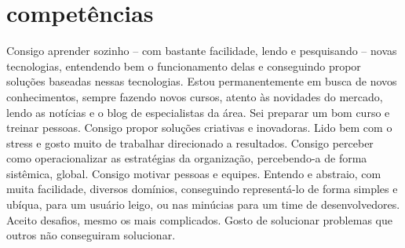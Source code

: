 \section{competências}

Consigo aprender sozinho – com bastante facilidade, lendo e pesquisando – novas tecnologias, entendendo bem o funcionamento delas e conseguindo propor soluções baseadas nessas tecnologias. Estou permanentemente em busca de novos conhecimentos, sempre fazendo novos cursos, atento às novidades do mercado, lendo as notícias e o blog de especialistas da área.
Sei preparar um bom curso e treinar pessoas.
Consigo propor soluções criativas e inovadoras.
Lido bem com o stress e gosto muito de trabalhar direcionado a resultados.
Consigo perceber como operacionalizar as estratégias da organização, percebendo-a de forma sistêmica, global.
Consigo motivar pessoas e equipes.
Entendo e abstraio, com muita facilidade, diversos domínios, conseguindo representá-lo de forma simples e ubíqua, para um usuário leigo, ou nas minúcias para um time de desenvolvedores.
Aceito desafios, mesmo os mais complicados.
Gosto de solucionar problemas que outros não conseguiram solucionar.






